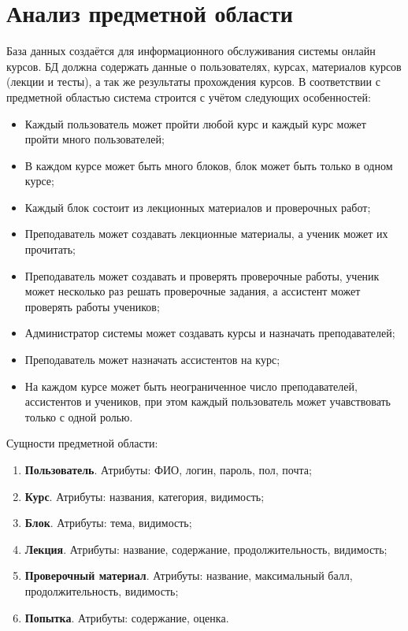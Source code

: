 \documentclass[a4paper,14pt]{article}
\begin{document}

\tableofcontents
\pagebreak

\section{Анализ предметной области}

База данных создаётся для информационного обслуживания системы онлайн курсов.
БД должна содержать данные о пользователях, курсах, материалов курсов (лекции и тесты), а так же результаты прохождения курсов.
В соответствии с предметной областью система строится с учётом следующих особенностей:

\begin{itemize}
	\item Каждый пользователь может пройти любой курс и каждый курс может пройти много пользователей;
	\item В каждом курсе может быть много блоков, блок может быть только в одном курсе;
	\item Каждый блок состоит из лекционных материалов и проверочных работ;
	\item Преподаватель может создавать лекционные материалы, а ученик может их прочитать;
	\item Преподаватель может создавать и проверять проверочные работы, ученик может несколько раз решать проверочные задания, а ассистент может проверять работы учеников;
	\item Администратор системы может создавать курсы и назначать преподавателей;
	\item Преподаватель может назначать ассистентов на курс;
	\item На каждом курсе может быть неограниченное число преподавателей, ассистентов и учеников, при этом каждый пользователь может учавствовать только с одной ролью.	
\end{itemize}

Сущности предметной области:

\begin{enumerate}
	\item \textbf{Пользователь}. Атрибуты: ФИО, логин, пароль, пол, почта;
	\item \textbf{Курс}. Атрибуты: названия, категория, видимость;
	\item \textbf{Блок}. Атрибуты: тема, видимость;
	\item \textbf{Лекция}. Атрибуты: название, содержание, продолжительность, видимость;
	\item \textbf{Проверочный материал}. Атрибуты: название, максимальный балл, продолжительность, видимость;
	\item \textbf{Попытка}. Атрибуты: содержание, оценка.
\end{enumerate}
\end{document}
